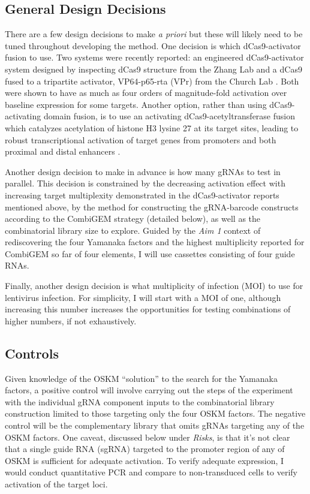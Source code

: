 \documentclass[10pt]{article}
\begin{document}
\subsection{General Design Decisions}

There are a few design decisions to make \textit{a priori} but these will likely need to be tuned throughout developing the method. One decision is which dCas9-activator fusion to use. Two systems were recently reported: an engineered dCas9-activator system designed by inspecting dCas9 structure from the Zhang Lab \cite{konermann2014genome} and a dCas9 fused to a tripartite activator, VP64-p65-rta (VPr) from the Church Lab \cite{chavez2015VPR}. Both were shown to have as much as four orders of magnitude-fold activation over baseline expression for some targets. Another option, rather than using dCas9-activating domain fusion, is to use an activating dCas9-acetyltransferase fusion which catalyzes acetylation of histone H3 lysine 27 at its target sites, leading to robust transcriptional activation of target genes from promoters and both proximal and distal enhancers \cite{hilton2015epigenome}.

Another design decision to make in advance is how many gRNAs to test in parallel. This decision is constrained by the decreasing activation effect with increasing target multiplexity demonstrated in the dCas9-activator reports mentioned above, by the method for constructing the gRNA-barcode constructs according to the CombiGEM \cite{cheng2014enhanced} strategy (detailed below), as well as the combinatorial library size to explore. Guided by the \textit{Aim 1} context of rediscovering the four Yamanaka factors and the highest multiplicity reported for CombiGEM so far of four elements, I will use cassettes consisting of four guide RNAs.

Finally, another design decision is what multiplicity of infection (MOI) to use for lentivirus infection. For simplicity, I will start with a MOI of one, although increasing this number increases the opportunities for testing combinations of higher numbers, if not exhaustively.

\subsection{Controls}

Given knowledge of the OSKM ``solution'' to the search for the Yamanaka factors, a positive control will involve carrying out the steps of the experiment with the individual gRNA component inputs to the combinatorial library construction limited to those targeting only the four OSKM factors. The negative control will be the complementary library that omits gRNAs targeting any of the OSKM factors. One caveat, discussed below under \textit{Risks}, is that it's not clear that a single guide RNA (sgRNA) targeted to the promoter region of any of OSKM is sufficient for adequate activation. To verify adequate expression, I would conduct quantitative PCR and compare to non-transduced cells to verify activation of the target loci.
\end{document}

